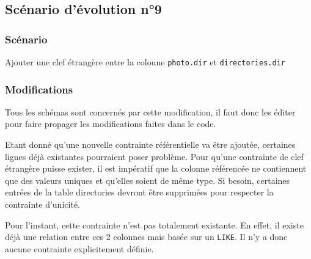 \subsection{Scénario d'évolution n°9}
\subsubsection{Scénario}
Ajouter une clef étrangère entre la colonne \texttt{photo.dir} et \texttt{directories.dir}

\subsubsection{Modifications}
Tous les schémas sont concernés par cette modification, il faut donc les éditer pour faire propager les modifications faites dans le code.

Etant donné qu'une nouvelle contrainte référentielle va être ajoutée, certaines lignes déjà existantes pourraient poser problème.
Pour qu'une contrainte de clef étrangère puisse exister, il est impératif que la colonne référencée ne contiennent que des valeurs uniques et qu'elles soient de même type.
Si besoin, certaines entrées de la table directories devront être supprimées pour respecter la contrainte d'unicité.

Pour l'instant, cette contrainte n'est pas totalement existante.
En effet, il existe déjà une relation entre ces 2 colonnes mais basée sur un \texttt{LIKE}. Il n'y a donc aucune contrainte explicitement définie.


